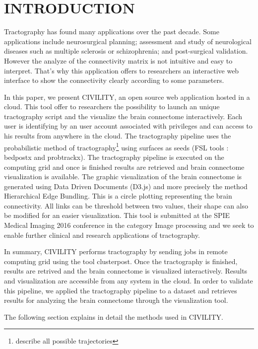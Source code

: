 \documentclass[]{spie}  %
\begin{document}
\section{INTRODUCTION}
\label{sec:intro}

Tractography has found many applications over the past decade. Some applications include neurosurgical planning; assessment and study of neurological diseases such as multiple sclerosis  or schizophrenia; and post-surgical validation. However the analyze of the connectivity matrix is not intuitive and easy to interpret. That's why this application offers to researchers an interactive web interface to show the connectivity clearly according to some parameters. 

In this paper, we present CIVILITY, an open source web application hosted in a cloud. This tool offer to researchers the possibility to launch an unique tractography script and the visualize the brain connectome interactively. Each user is identifying by an user account associated with privileges and can access to his results from anywhere in the cloud.
The tractography pipeline uses the probabilistic method  of tractography\footnote{describe all possible trajectories} using surfaces as seeds (FSL tools : bedpostx and probtrackx). The tractography pipeline is executed on the computing grid and once is finished results are retrieved and brain connectome visualization is available. 
The graphic visualization of the brain connectome is generated using Data Driven Documents (D3.js) and more precisely the method Hierarchical Edge Bundling. This is a circle plotting representing the brain connectivity. All links can be threshold between two values, their shape can also be modified for an easier visualization. This tool is submitted at the SPIE Medical Imaging 2016 conference in the category Image processing and we seek to enable further clinical and research applications of tractography.

In summary, CIVILITY performs tractography by sending jobs in remote computing grid using the tool clusterpost. Once the tractography is finished, results are retrived and the brain connectome is visualized interactively. Results and visualization are accessible from any system in the cloud.
In order to validate this pipeline, we applied the tractography pipeline to a dataset and retrieves results for analyzing the brain connectome through the visualization tool.

The following section explains in detail the methods used in CIVILITY.
\end{document}
